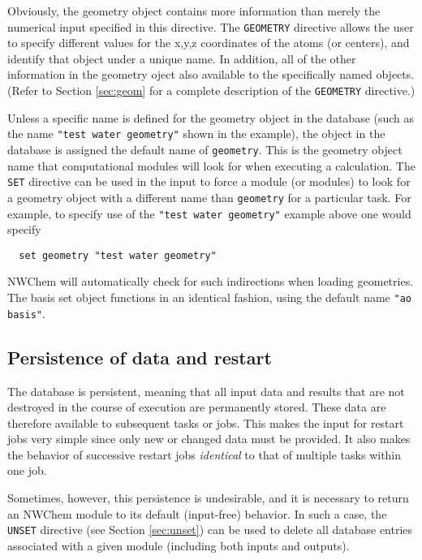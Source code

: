Obviously, the geometry object contains more information than merely the
numerical input specified in this directive.  The \verb+GEOMETRY+
directive allows the user to specify different values for the x,y,z
coordinates of the atoms (or centers), and identify that object under
a unique name.  In addition, all of the other information in the 
geometry oject also available
to the specifically named objects.  (Refer to Section
\ref{sec:geom} for a complete description of the {\tt GEOMETRY}
directive.)

Unless a specific name is defined for the geometry object in the
database (such as the name \verb+"test water geometry"+ shown in the
example), the object in the database is assigned the default name of
\verb+geometry+.  This is the geometry object name that computational
modules will look for when executing a calculation.  The {\tt SET}
directive can be used in the input to force a module (or modules) to
look for a geometry object with a different name than \verb+geometry+
for a particular task.  For example, to specify use of the 
\verb+"test water geometry"+ example above one would specify

\begin{verbatim}
  set geometry "test water geometry"
\end{verbatim}

NWChem will automatically check for such indirections when loading
geometries.  The basis set object functions in an identical fashion,
using the default name \verb+"ao basis"+.


\subsection{Persistence of data and restart}
\label{sec:persist}

The database is persistent, meaning that all input data and results
that are not destroyed in the course of execution are permanently
stored.  These data are therefore available to subsequent tasks or
jobs.  This makes the input for restart jobs very simple since only
new or changed data must be provided.  It also makes the behavior of
successive restart jobs {\em identical} to that of multiple tasks
within one job.  

Sometimes, however, this persistence is undesirable, and it is
necessary to return an NWChem module to its default (input-free)
behavior. In such a case, the \verb+UNSET+ directive (see Section
\ref{sec:unset}) can be used to delete all database entries associated
with a given module (including both inputs and outputs).






